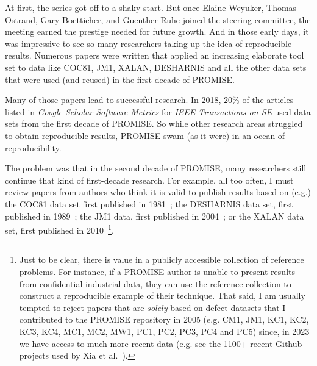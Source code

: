 \documentclass[sigconf,screen]{acmart}
\begin{document}
At first, the series got off to a shaky  start. But once
Elaine Weyuker, Thomas Ostrand, Gary  Boetticher, and Guenther Ruhe
joined the steering committee, the meeting earned the prestige needed for future  growth.
And
in those early days, it
was impressive to see so many researchers
taking up the idea of reproducible results.
Numerous papers were written that applied an increasing
elaborate tool set to data like COC81, JM1, XALAN, DESHARNIS
and all the other data sets that were used (and reused) in the first decade of PROMISE.

Many of those papers lead to successful research. In 2018, 20\% of the articles listed in {\em Google Scholar Software Metrics} for {\em IEEE Transactions
on SE} used data sets from the first decade of PROMISE. So while other research areas struggled to obtain reproducible results, PROMISE swam (as it were) in an ocean of reproducibility.

The problem was that in the second decade of PROMISE, many researchers still continue that kind of first-decade research. For example,   all too often, I must review papers from authors who think it is valid
to publish results based on (e.g.) the COC81 data set first published in 1981~\cite{Boehm1981}; the DESHARNIS data set,  first published in 1989~\cite{desharnais1989analyse}; the JM1 data, first published in 2004~\cite{menzies2004good}; or the XALAN data set, first published in 2010~\cite{jureczko2010towards}\footnote{Just to be clear,
there is value in   a publicly accessible collection of reference problems. For instance, if a PROMISE author is unable to present results from confidential industrial data, they can use the reference collection to construct a reproducible example of their technique. That said, I am usually tempted to reject papers that are {\em solely} based on defect datasets that I contributed to the PROMISE repository in 2005 (e.g. CM1, JM1, KC1, KC2, KC3, KC4, MC1, MC2, MW1, PC1, PC2, PC3, PC4 and PC5)
since, in 2023 we have access to much more recent data
(e.g. see the 1100+ recent Github projects
used by Xia et al.~\cite{xia22}).}.
 

\end{document}
